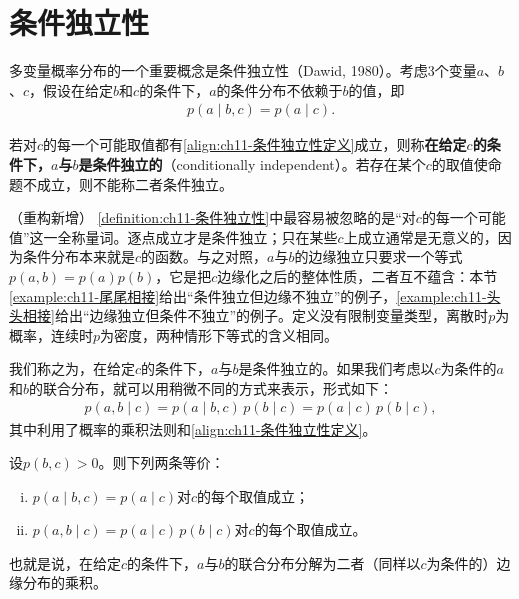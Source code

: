 \documentclass[../../main.tex]{subfiles}
\begin{document}
\section{条件独立性}\label{section:ch11-条件独立性}

多变量概率分布的一个重要概念是条件独立性（Dawid, 1980）。考虑3个变量$a$、$b$、$c$，假设在给定$b$和$c$的条件下，$a$的条件分布不依赖于$b$的值，即
\begin{align}
  p(a\mid b,c) = p(a\mid c).
  \label{align:ch11-条件独立性定义}
\end{align}

\begin{definition}[条件独立性]\label{definition:ch11-条件独立性}
若对$c$的每一个可能取值都有\eqref{align:ch11-条件独立性定义}成立，则称\textbf{在给定$c$的条件下，$a$与$b$是条件独立的}（conditionally independent）。若存在某个$c$的取值使命题不成立，则不能称二者条件独立。
\end{definition}

\begin{remark}（重构新增）
\cref{definition:ch11-条件独立性}中最容易被忽略的是“对$c$的每一个可能值”这一全称量词。逐点成立才是条件独立；只在某些$c$上成立通常是无意义的，因为条件分布本来就是$c$的函数。与之对照，$a$与$b$的边缘独立只要求一个等式$p(a,b)=p(a)p(b)$，它是把$c$边缘化之后的整体性质，二者互不蕴含：本节\cref{example:ch11-尾尾相接}给出“条件独立但边缘不独立”的例子，\cref{example:ch11-头头相接}给出“边缘独立但条件不独立”的例子。定义没有限制变量类型，离散时$p$为概率，连续时$p$为密度，两种情形下等式的含义相同。
\end{remark}

我们称之为，在给定$c$的条件下，$a$与$b$是条件独立的。如果我们考虑以$c$为条件的$a$和$b$的联合分布，就可以用稍微不同的方式来表示，形式如下：
\begin{align}
  p(a,b\mid c) = p(a\mid b,c)\,p(b\mid c) = p(a\mid c)\,p(b\mid c),
  \label{align:ch11-条件独立性分解}
\end{align}
其中利用了概率的乘积法则和\eqref{align:ch11-条件独立性定义}。

\begin{proposition}[条件独立性的等价刻画]\label{proposition:ch11-条件独立性等价}
设$p(b,c)>0$。则下列两条等价：
\begin{enumerate}[(i)]
  \item $p(a\mid b,c)=p(a\mid c)$对$c$的每个取值成立；
  \item $p(a,b\mid c)=p(a\mid c)\,p(b\mid c)$对$c$的每个取值成立。
\end{enumerate}
也就是说，在给定$c$的条件下，$a$与$b$的联合分布分解为二者（同样以$c$为条件的）边缘分布的乘积。
\end{proposition}
\end{document}
